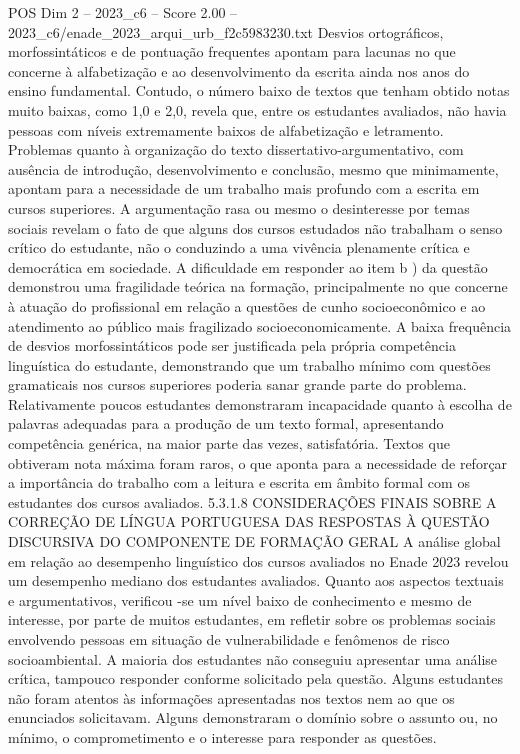 \begin{textsample}{POS Dim 2 – 2023\_c6 – Score 2.00 – 2023\_c6/enade\_2023\_arqui\_urb\_f2c5983230.txt}
Desvios ortográficos, morfossintáticos e de pontuação frequentes apontam para lacunas no que concerne à alfabetização e ao desenvolvimento da escrita ainda nos anos do ensino fundamental.
Contudo, o número baixo de textos que tenham obtido notas muito baixas, como 1,0 e 2,0, revela que, entre os estudantes avaliados, não havia pessoas com níveis extremamente baixos de alfabetização e letramento.
Problemas quanto à organização do texto dissertativo-argumentativo, com ausência de introdução, desenvolvimento e conclusão, mesmo que minimamente, apontam para a necessidade de um trabalho mais profundo com a escrita em cursos superiores.
A argumentação rasa ou mesmo o desinteresse por temas sociais revelam o fato de que alguns dos cursos estudados não trabalham o senso crítico do estudante, não o conduzindo a uma vivência plenamente crítica e democrática em sociedade.
A dificuldade em responder ao item b ) da questão demonstrou uma fragilidade teórica na formação, principalmente no que concerne à atuação do profissional em relação a questões de cunho socioeconômico e ao atendimento ao público mais fragilizado socioeconomicamente.
A baixa frequência de desvios morfossintáticos pode ser justificada pela própria competência linguística do estudante, demonstrando que um trabalho mínimo com questões gramaticais nos cursos superiores poderia sanar grande parte do problema.
Relativamente poucos estudantes demonstraram incapacidade quanto à escolha de palavras adequadas para a produção de um texto formal, apresentando competência genérica, na maior parte das vezes, satisfatória.
Textos que obtiveram nota máxima foram raros, o que aponta para a necessidade de reforçar a importância do trabalho com a leitura e escrita em âmbito formal com os estudantes dos cursos avaliados. 5.3.1.8 CONSIDERAÇÕES FINAIS SOBRE A CORREÇÃO DE LÍNGUA PORTUGUESA DAS RESPOSTAS À QUESTÃO DISCURSIVA DO COMPONENTE DE FORMAÇÃO GERAL A análise global em relação ao desempenho linguístico dos cursos avaliados no Enade 2023 revelou um desempenho mediano dos estudantes avaliados.
Quanto aos aspectos textuais e argumentativos, verificou -se um nível baixo de conhecimento e mesmo de interesse, por parte de muitos estudantes, em refletir sobre os problemas sociais envolvendo pessoas em situação de vulnerabilidade e fenômenos de risco socioambiental.
A maioria dos estudantes não conseguiu apresentar uma análise crítica, tampouco responder conforme solicitado pela questão.
Alguns estudantes não foram atentos às informações apresentadas nos textos nem ao que os enunciados solicitavam.
Alguns demonstraram o domínio sobre o assunto ou, no mínimo, o comprometimento e o interesse para responder as questões.

\end{textsample}
